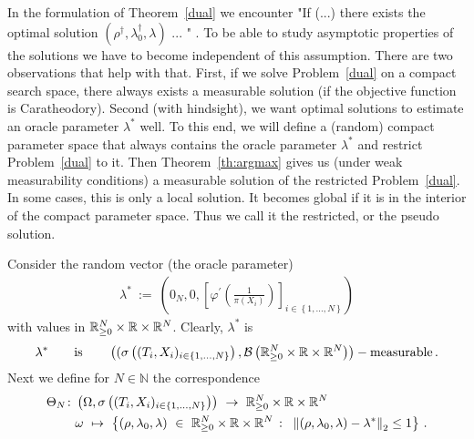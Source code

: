 In the formulation of Theorem~\ref{dual} we encounter "If (...) there exists the optimal solution $(\rho^\dagger,\lambda_0^\dagger,\lambda)$ ... " .
To be able to study asymptotic properties of the solutions we have to become independent of this assumption.
There are two observations that help with that.
First, if we solve Problem~\ref{dual} on a compact search space, there always exists a measurable solution (if the objective function is Caratheodory).
Second (with hindsight), we want optimal solutions to estimate an oracle parameter $\lambda^*$ well. 
To this end, we will define a (random) compact parameter space that always contains the oracle parameter $\lambda^*$ and restrict Problem~\ref{dual} to it.
Then Theorem~\ref{th:argmax} gives us (under weak measurability conditions) a measurable solution of the restricted Problem~\ref{dual}.
In some cases, this is only a local solution. It becomes global if it is in the interior of the compact parameter space.
Thus we call it the restricted, or the pseudo solution.

Consider 
the random vector (the oracle parameter)
\begin{align*}
  \lambda^*
  \ 
  :=
  \ 
  \left(
  0_{N},0,
  \left[
  \varphi^{'}
  \left(
  \frac
  {1}
  {\pi(X_i)}
  \right)
\right]_{i\in \left\{
  1,\ldots,N
\right\}}
  \right)
\end{align*}
with values in 
$\mathbb{R}^N_{\ge 0}\times \mathbb{R}\times \mathbb{R}^N$.
Clearly, $\lambda^*$ is 
\begin{align*}
 \lambda^*
 \qquad
 \text{is}
 \qquad
 \left(
( 
\sigma
\left( 
  (T_i,X_i)_{i\in 
\left\{ 1,\ldots,N \right\}
  } 
\right)
,
\mathcal{B}
\left( 
\mathbb{R}^N_{\ge 0}\times \mathbb{R}\times \mathbb{R}^N
\right)
\right)
-\text{measurable}
\,.
\end{align*}
Next we define for $N\in\mathbb{N}$ the correspondence  
\begin{align*}
  \Theta_N\colon
  &
  \left( 
  \Omega,
\sigma
\left( 
  (T_i,X_i)_{i\in 
\left\{ 1,\ldots,N \right\}
  } 
\right)
  \right)
  \ 
\to
  \ 
\R^N_{\ge 0}\times \R\times \R^N
\\
&
\omega
  \ 
\mapsto
  \ 
\left\{ 
  \left( 
  \rho,\lambda_0,\lambda
  \right)
  \ 
  \in
  \ 
\R^N_{\ge 0}\times \R\times \R^N
  \ 
\colon
  \ 
\norm{
  \left( 
  \rho,\lambda_0,\lambda
  \right)
-\lambda^*}_2\le 1
\right\}
\,.
\end{align*}

